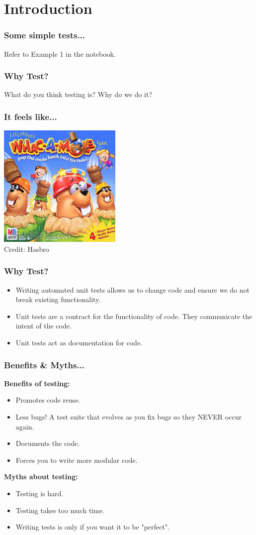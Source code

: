 \documentclass{beamer}
\begin{document}
\section{Introduction}
\begin{frame}
	\frametitle{Some simple tests...}
	Refer to Example 1 in the notebook.
\end{frame}


\begin{frame}
	\frametitle{Why Test?}
	What do you think testing is? Why do we do it?
\end{frame}

\begin{frame}
	\frametitle{It feels like...}
	\includegraphics{images/wam.jpeg}
	\\Credit: Hasbro
\end{frame}

\begin{frame}
	\frametitle{Why Test?}
	\begin{itemize}
	\item Writing automated unit tests allows us to change code and ensure we do not break existing functionality. \pause
	\item Unit tests are a contract for the functionality of code. They communicate the intent of the code. \pause
	\item Unit tests act as documentation for code.
	\end{itemize}
\end{frame}

\begin{frame}
	\frametitle{Benefits \& Myths...}
\textbf{Benefits of testing:}
	\begin{itemize}
		\item Promotes code reuse.
		\item Less bugs! A test suite that evolves as you fix bugs so they NEVER occur again.
		\item Documents the code.
		\item Forces you to write more modular code.
		\end{itemize}\pause
		\textbf{Myths about testing:}
		\begin{itemize}
		\item Testing is hard.
		\item Testing takes too much time.
		\item Writing tests is only if you want it to be "perfect".
		\end{itemize}

\end{frame}
\end{document}
